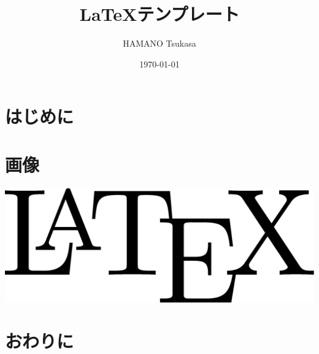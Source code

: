 \documentclass[a4j,onecolumn,11ptj,uplatex]{jsarticle}
\title{\LaTeX テンプレート}
\author{HAMANO Tsukasa}
\date{\today}
\begin{document}
\maketitle
\vspace{1em}
\tableofcontents
\clearpage

\section{はじめに}
\lipsum[1]

\section{画像}
\includegraphics[width=\textwidth]{latex.eps}

\section{おわりに}
\lipsum[2]
\end{document}
